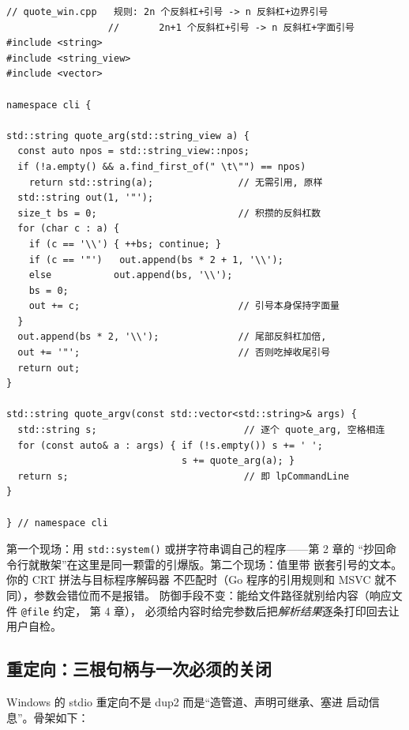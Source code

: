\documentclass[12pt,a4paper,fontset=fandol]{ctexbook}
\newcommand{\Fn}[1]{\texttt{#1()}}
\newcommand{\Tp}[1]{\texttt{#1}}
\begin{document}
\begin{lstlisting}[caption={按 MSVC CRT 规则拼单个参数（quote\_win.cpp）}]
// quote_win.cpp   规则: 2n 个反斜杠+引号 -> n 反斜杠+边界引号
                  //       2n+1 个反斜杠+引号 -> n 反斜杠+字面引号
#include <string>
#include <string_view>
#include <vector>

namespace cli {

std::string quote_arg(std::string_view a) {
  const auto npos = std::string_view::npos;
  if (!a.empty() && a.find_first_of(" \t\"") == npos)
    return std::string(a);               // 无需引用, 原样
  std::string out(1, '"');
  size_t bs = 0;                         // 积攒的反斜杠数
  for (char c : a) {
    if (c == '\\') { ++bs; continue; }
    if (c == '"')   out.append(bs * 2 + 1, '\\');
    else           out.append(bs, '\\');
    bs = 0;
    out += c;                            // 引号本身保持字面量
  }
  out.append(bs * 2, '\\');              // 尾部反斜杠加倍,
  out += '"';                            // 否则吃掉收尾引号
  return out;
}

std::string quote_argv(const std::vector<std::string>& args) {
  std::string s;                          // 逐个 quote_arg, 空格相连
  for (const auto& a : args) { if (!s.empty()) s += ' ';
                               s += quote_arg(a); }
  return s;                               // 即 lpCommandLine
}

} // namespace cli
\end{lstlisting}

\begin{warning}[title={引用规则的两个常见破坏现场}]
第一个现场：用 \Fn{std::system} 或拼字符串调自己的程序——第 2 章的
``抄回命令行就散架''在这里是同一颗雷的引爆版。第二个现场：值里带
嵌套引号的文本。你的 CRT 拼法与目标程序解码器
不匹配时（Go 程序的引用规则和 MSVC 就不同），参数会错位而不是报错。
防御手段不变：能给文件路径就别给内容（响应文件 \Tp{@file} 约定，
第 4 章），
必须给内容时给完参数后把\emph{解析结果}逐条打印回去让用户自检。
\end{warning}

\subsection{重定向：三根句柄与一次必须的关闭}

Windows 的 stdio 重定向不是 dup2 而是``造管道、声明可继承、塞进
启动信息''。骨架如下：
\end{document}
